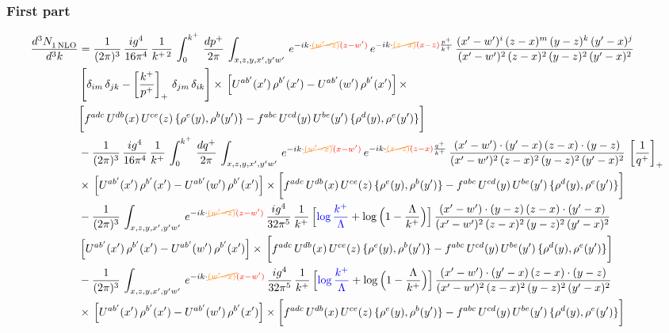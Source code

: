 \documentclass[9pt]{article}
\numberwithin{equation}{section}
\begin{document}
\subsubsection*{First part}
\begin{align}
     \frac{d^{3}N_{1\,\rm NLO}^{\rm}}{d^{3}k}  & = \frac{1}{(2\pi)^{3}}\, \frac{ig^{4}}{16\pi^{4}}\, \frac{1}{k^{+\,2}}\,\int_{0}^{k^{+}}\, \frac{dp^{+}}{2\pi}\,\int_{x,z,y,x',y'w'}\,e^{-ik\cdot {\color{orange}\cancel{(w^\prime-z)}}{\color{red}(z-w^\prime)}}\,e^{-ik\cdot {\color{orange}\cancel{(z-x)}}{\color{red}(x-z)}\frac{p^{+}}{k^{+}}}\,\frac{(x'-w')^{i}\,(z-x)^{m}\,(y-z)^{k}\,(y'-x)^{j}}{(x'-w')^{2}\,(z-x)^{2}\,(y-z)^{2}\,(y'-x)^{2}}\,\notag \\ & \left[\delta_{im}\,\delta_{jk}-\left[\frac{k^{+}}{p^{+}}\right]_{+}\, \delta_{jm}\,\delta_{ik}\right]\times\, \left[U^{ab'}(x')\,\rho^{b'}(x')-U^{ab'}(w')\,\rho^{b'}(x')\right]\times\notag \\ & \bigg[f^{adc}\,U^{db}(x)\,U^{ce}(z)\, \{\rho^{e}(y),\rho^{b}(y')\}-f^{abc}\,U^{cd}(y)\,U^{be}(y')\, \{\rho^{d}(y),\rho^{e}(y')\}\bigg]\notag \\ & -\frac{1}{(2\pi)^{3}}\, \frac{ig^{4}}{16\pi^{4}}\, \frac{1}{k^{+}}\,\int_{0}^{k^{+}}\, \frac{dq^{+}}{2\pi}\,\int_{x,z,y,x',y'w'}\,e^{-ik\cdot {\color{orange}\cancel{(w^\prime-x)}}{\color{red}(x-w^\prime)}}\,e^{-ik\cdot {\color{orange}\cancel{(x-z)}}{\color{red}(z-x)}\frac{q^{+}}{k^{+}}}\,\frac{(x'-w')\cdot (y'-x)\,(z-x)\cdot (y-z)}{(x'-w')^{2}\,(z-x)^{2}\,(y-z)^{2}\,(y'-x)^{2}}\,\left[\frac{1}{q^{+}}\right]_{+}\notag \\ & \times\, \left[U^{ab'}(x')\,\rho^{b'}(x')-U^{ab'}(w')\,\rho^{b'}(x')\right]\times \bigg[f^{adc}\,U^{db}(x)\,U^{ce}(z)\, \{\rho^{e}(y),\rho^{b}(y')\}-f^{abc}\,U^{cd}(y)\,U^{be}(y')\, \{\rho^{d}(y),\rho^{e}(y')\}\bigg]\notag \\ & -\frac{1}{(2\pi)^{3}}\, \int_{x,z,y,x',y'w'}\,e^{-ik\cdot {\color{orange}\cancel{(w^\prime-z)}}{\color{red}(z-w^\prime)}}\,\frac{ig^{4}}{32\pi^{5}}\, \frac{1}{k^{+}}\,\Big[{\color{blue}\log\frac{k^{+}}{\Lambda}}+\log\Big(1-\frac{\Lambda}{k^{+}}\Big)\Big]\,\frac{(x'-w')\cdot (y-z)\,(z-x)\cdot (y'-x)}{(x'-w')^{2}\,(z-x)^{2}\,(y-z)^{2}\,(y'-x)^{2}}\,\notag \\ & \left[U^{ab'}(x')\,\rho^{b'}(x')-U^{ab'}(w')\,\rho^{b'}(x')\right]\times\, \bigg[f^{adc}\,U^{db}(x)\,U^{ce}(z)\, \{\rho^{e}(y),\rho^{b}(y')\}-f^{abc}\,U^{cd}(y)\,U^{be}(y')\, \{\rho^{d}(y),\rho^{e}(y')\}\bigg]\notag \\ &  -\frac{1}{(2\pi)^{3}}\, \int_{x,z,y,x',y'w'}\,e^{-ik\cdot {\color{orange}\cancel{(w^\prime-x)}}{\color{red}(x-w^\prime)}}\,\frac{ig^{4}}{32\pi^{5}}\, \frac{1}{k^{+}}\,\Big[{\color{blue}\log\frac{k^{+}}{\Lambda}}+\log\Big(1-\frac{\Lambda}{k^{+}}\Big)\Big]\,\frac{(x'-w')\cdot (y'-x)\,(z-x)\cdot (y-z)}{(x'-w')^{2}\,(z-x)^{2}\,(y-z)^{2}\,(y'-x)^{2}}\notag \\ & \times\, \left[U^{ab'}(x')\,\rho^{b'}(x')-U^{ab'}(w')\,\rho^{b'}(x')\right]\times \bigg[f^{adc}\,U^{db}(x)\,U^{ce}(z)\, \{\rho^{e}(y),\rho^{b}(y')\}-f^{abc}\,U^{cd}(y)\,U^{be}(y')\, \{\rho^{d}(y),\rho^{e}(y')\}\bigg]
\end{align}
\end{document}
